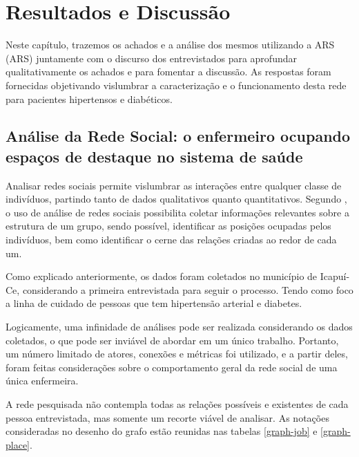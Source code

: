 \chapter{Resultados e Discussão}
\label{chap:resultados}

Neste capítulo, trazemos os achados e a análise dos mesmos utilizando a \acrlong{ARS} (\acrshort{ARS}) juntamente com o discurso dos entrevistados para aprofundar qualitativamente os achados e para fomentar a discussão.  As respostas foram fornecidas objetivando vislumbrar a caracterização e o funcionamento desta rede para pacientes hipertensos e diabéticos. 

\section{Análise da Rede Social: o enfermeiro ocupando espaços de destaque no sistema de saúde}

Analisar redes sociais permite vislumbrar as interações entre qualquer classe de indivíduos, partindo tanto de dados qualitativos quanto quantitativos. Segundo ,  o uso de  análise de redes sociais possibilita coletar informações relevantes sobre a estrutura de um grupo, sendo possível, identificar as posições ocupadas pelos indivíduos, bem como identificar o cerne das relações criadas ao redor de cada um.

Como explicado anteriormente, os dados foram coletados no município de Icapuí-Ce, considerando a primeira entrevistada para seguir o processo. Tendo como foco a linha de cuidado de pessoas que tem hipertensão arterial e diabetes. 

Logicamente, uma infinidade de análises pode ser realizada considerando os dados coletados, o que pode ser inviável de abordar em um único trabalho. Portanto, um número limitado de atores, conexões e métricas foi utilizado, e a partir deles, foram feitas considerações sobre o comportamento geral da rede social de uma única enfermeira. 

A rede pesquisada não contempla todas as relações possíveis e existentes de cada pessoa entrevistada, mas somente um recorte viável de analisar. As notações consideradas no desenho do grafo estão reunidas nas tabelas \ref{graph-job} e \ref{graph-place}.

